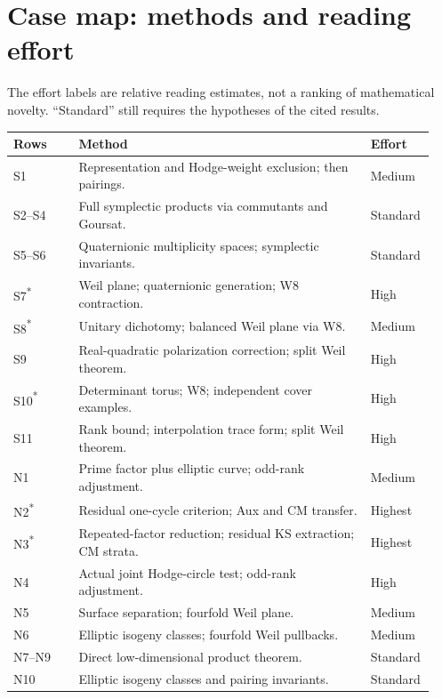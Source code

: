 \documentclass[10pt,a4paper]{article}
\newcommand{\external}{\textcolor{Warn}{\textsuperscript{*}}}
\begin{document}
\section*{Case map: methods and reading effort}
The effort labels are relative reading estimates, not a ranking of mathematical novelty. ``Standard'' still requires the hypotheses of the cited results.
\par\medskip\small\begin{tabular}{@{}p{0.15\linewidth}p{0.67\linewidth}p{0.12\linewidth}@{}}\toprule
Rows & Method & Effort\\\midrule
S1 & Representation and Hodge-weight exclusion; then pairings. & Medium\\[4pt]
S2--S4 & Full symplectic products via commutants and Goursat. & Standard\\[4pt]
S5--S6 & Quaternionic multiplicity spaces; symplectic invariants. & Standard\\[4pt]
S7\external & Weil plane; quaternionic generation; W8 contraction. & High\\[4pt]
S8\external & Unitary dichotomy; balanced Weil plane via W8. & Medium\\[4pt]
S9 & Real-quadratic polarization correction; split Weil theorem. & High\\[4pt]
S10\external & Determinant torus; W8; independent cover examples. & High\\[4pt]
S11 & Rank bound; interpolation trace form; split Weil theorem. & High\\[4pt]
N1 & Prime factor plus elliptic curve; odd-rank adjustment. & Medium\\[4pt]
N2\external & Residual one-cycle criterion; Aux and CM transfer. & Highest\\[4pt]
N3\external & Repeated-factor reduction; residual KS extraction; CM strata. & Highest\\[4pt]
N4 & Actual joint Hodge-circle test; odd-rank adjustment. & High\\[4pt]
N5 & Surface separation; fourfold Weil plane. & Medium\\[4pt]
N6 & Elliptic isogeny classes; fourfold Weil pullbacks. & Medium\\[4pt]
N7--N9 & Direct low-dimensional product theorem. & Standard\\[4pt]
N10 & Elliptic isogeny classes and pairing invariants. & Standard\\[4pt]
\bottomrule\end{tabular}\par\normalsize
\end{document}
